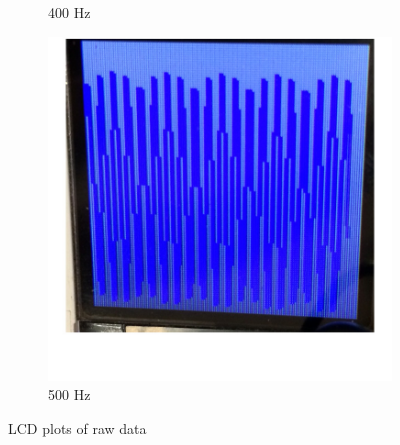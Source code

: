 \documentclass[12pt]{article}
\begin{document}
\begin{figure}[H]
\begin{subfigure}[b]{0.3\textwidth}
    \caption{400 Hz}
    \label{fig:raw_400}
  \end{subfigure}
  \begin{subfigure}[b]{0.3\textwidth}
    \includegraphics[width=\textwidth]{./img/raw_500Hz}
    \caption{500 Hz}
    \label{fig:raw_500}
  \end{subfigure}
  \caption{LCD plots of raw data}
  \label{fig:lcd-plots-raw}
\end{figure}
\end{document}
